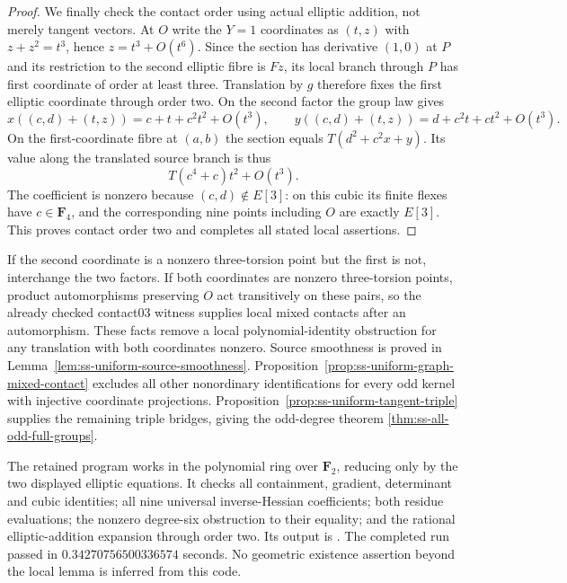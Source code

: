 \begin{proof}
We finally check the contact order using actual elliptic addition,
not merely tangent vectors. At $O$ write the $Y=1$ coordinates as
$(t,z)$ with $z+z^2=t^3$, hence $z=t^3+O(t^6)$. Since the section
has derivative $(1,0)$ at $P$ and its restriction to the second
elliptic fibre is $Fz$, its local branch through $P$ has first
coordinate of order at least three. Translation by $g$ therefore
fixes the first elliptic coordinate through order two. On the second
factor the group law gives
\[
 x((c,d)+(t,z))=c+t+c^2t^2+O(t^3),\qquad
 y((c,d)+(t,z))=d+c^2t+ct^2+O(t^3).
\]
On the first-coordinate fibre at $(a,b)$ the section equals
$T(d^2+c^2x+y)$. Its value along the translated source branch is
thus
\[
                         T(c^4+c)t^2+O(t^3).
\]
The coefficient is nonzero because $(c,d)\notin E[3]$: on this cubic
its finite flexes have $c\in\mathbf F_4$, and the corresponding
nine points including $O$ are exactly $E[3]$. This proves contact
order two and completes all stated local assertions.
\end{proof}

\begin{remark}
If the second coordinate is a nonzero three-torsion point but the
first is not, interchange the two factors. If both coordinates are
nonzero three-torsion points, product automorphisms preserving $O$
act transitively on these pairs, so the already checked contact03
witness supplies local mixed contacts after an automorphism.
These facts remove a local polynomial-identity obstruction for any
translation with both coordinates nonzero. Source smoothness is proved in
Lemma~\ref{lem:ss-uniform-source-smoothness}. Proposition~\ref{prop:ss-uniform-graph-mixed-contact} excludes all other
nonordinary identifications for every odd kernel with injective
coordinate projections. Proposition~\ref{prop:ss-uniform-tangent-triple}
supplies the remaining triple bridges, giving the odd-degree theorem
\ref{thm:ss-all-odd-full-groups}.
\end{remark}

\begin{remark}
The retained program
works in the polynomial ring over $\mathbf F_2$, reducing only by the
two displayed elliptic equations. It checks all containment, gradient,
determinant and cubic identities; all nine universal inverse-Hessian
coefficients; both residue evaluations; the nonzero degree-six
obstruction to their equality; and the rational elliptic-addition
expansion through order two. Its output is
.
The completed run passed in $0.34270756500336574$ seconds. No geometric
existence assertion beyond the local lemma is inferred from this code.
\end{remark}
